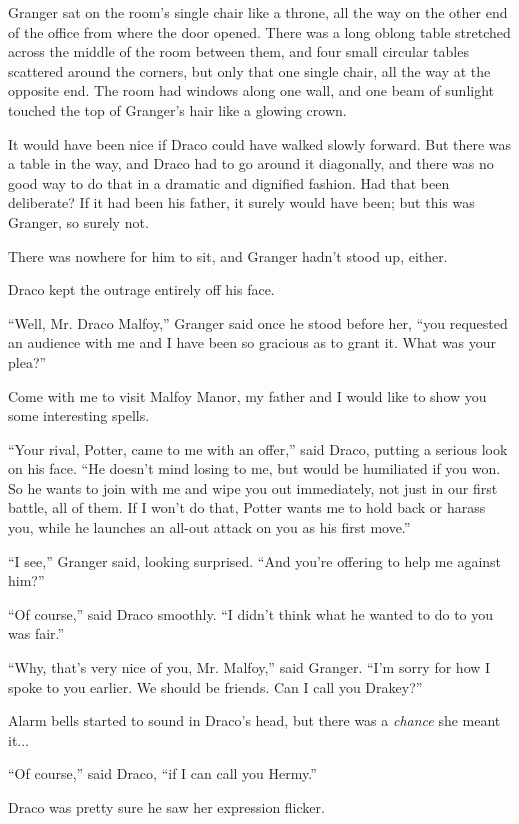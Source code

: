 Granger sat on the room's single chair like a throne, all the way on the other end of the office from where the door opened. There was a long oblong table stretched across the middle of the room between them, and four small circular tables scattered around the corners, but only that one single chair, all the way at the opposite end. The room had windows along one wall, and one beam of sunlight touched the top of Granger's hair like a glowing crown.

It would have been nice if Draco could have walked slowly forward. But there was a table in the way, and Draco had to go around it diagonally, and there was no good way to do that in a dramatic and dignified fashion. Had that been deliberate? If it had been his father, it surely would have been; but this was Granger, so surely not.

There was nowhere for him to sit, and Granger hadn't stood up, either.

Draco kept the outrage entirely off his face.

``Well, Mr. Draco Malfoy,'' Granger said once he stood before her, ``you requested an audience with me and I have been so gracious as to grant it. What was your plea?''

Come with me to visit Malfoy Manor, my father and I would like to show you some interesting spells.

``Your rival, Potter, came to me with an offer,'' said Draco, putting a serious look on his face. ``He doesn't mind losing to me, but would be humiliated if you won. So he wants to join with me and wipe you out immediately, not just in our first battle, all of them. If I won't do that, Potter wants me to hold back or harass you, while he launches an all-out attack on you as his first move.''

``I see,'' Granger said, looking surprised. ``And you're offering to help me against him?''

``Of course,'' said Draco smoothly. ``I didn't think what he wanted to do to you was fair.''

``Why, that's very nice of you, Mr. Malfoy,'' said Granger. ``I'm sorry for how I spoke to you earlier. We should be friends. Can I call you Drakey?''

Alarm bells started to sound in Draco's head, but there was a \emph{chance} she meant it...

``Of course,'' said Draco, ``if I can call you Hermy.''

Draco was pretty sure he saw her expression flicker.


